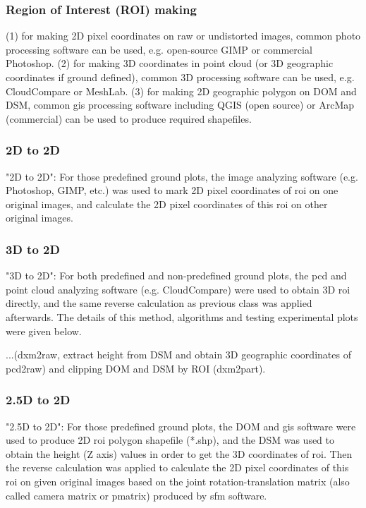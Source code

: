 \documentclass[sensors,article,submit,moreauthors, xelatex]{Definitions/mdpi}
\begin{document}




\subsubsection{Region of Interest (ROI) making}
(1) for making 2D pixel coordinates on raw or undistorted images, common photo processing software can be used, e.g. open-source GIMP or commercial Photoshop. (2) for making 3D coordinates in point cloud (or 3D geographic coordinates if ground defined), common 3D processing software can be used, e.g. CloudCompare or MeshLab. (3) for making 2D geographic polygon on DOM and DSM, common \acrfull*{gis} processing software including QGIS (open source) or ArcMap (commercial) can be used to produce required shapefiles.

\subsubsection{2D to 2D}
"2D to 2D": For those predefined ground plots, the image analyzing software (e.g. Photoshop, GIMP, etc.) was used to mark 2D pixel coordinates of \acrshort*{roi} on one original images, and calculate the 2D pixel coordinates of this \acrshort*{roi} on other original images.

\subsubsection{3D to 2D}
"3D to 2D": For both predefined and non-predefined ground plots, the \acrfull*{pcd} and point cloud analyzing software (e.g. CloudCompare) were used to obtain 3D \acrshort*{roi} directly, and the same reverse calculation as previous class was applied afterwards. The details of this method, algorithms and testing experimental plots were given below.

...(dxm2raw, extract height from DSM and obtain 3D geographic coordinates of pcd2raw) and clipping DOM and DSM by ROI (dxm2part).

\subsubsection{2.5D to 2D}
"2.5D to 2D": For those predefined ground plots, the DOM and \acrfull*{gis} software were used to produce 2D \acrshort*{roi} polygon shapefile (*.shp), and the DSM was used to obtain the height (Z axis) values in order to get the 3D coordinates of \acrshort*{roi}. Then the reverse calculation was applied to calculate the 2D pixel coordinates of this \acrshort*{roi} on given original images based on the joint rotation-translation matrix (also called camera matrix or pmatrix) produced by \acrshort*{sfm} software.
\end{document}
